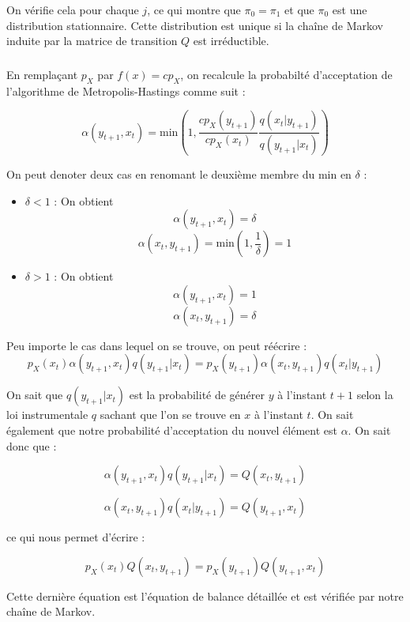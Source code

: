 On vérifie cela pour chaque $j$, ce qui montre que $\pi_0 = \pi_1$ et que $\pi_0$ est une distribution stationnaire. Cette distribution est unique si la chaîne de Markov induite par la matrice de transition $Q$ est irréductible. 

\subsubsection{}
En remplaçant $p_X$ par $f(x) = cp_X$, on recalcule la probabilté d'acceptation de l'algorithme de Metropolis-Hastings comme suit :

\begin{equation*}
  \alpha(y_{t+1},x_t) = \text{min}(1,\frac{cp_X(y_{t+1})}{cp_X(x_t)}\frac{q(x_t|y_{t+1})}{q(y_{t+1}|x_t)})
\end{equation*}

On peut denoter deux cas en renomant le deuxième membre du min en $\delta$ : 

\begin{itemize}
  \item $\delta < 1$ : On obtient 
  \begin{equation*}
    \alpha(y_{t+1},x_t) = \delta
  \end{equation*}
  \begin{equation*}
    \alpha(x_t,y_{t+1}) = \text{min}(1,\frac{1}{\delta}) = 1
  \end{equation*}
  \item $\delta > 1$ : On obtient
  \begin{equation*}
    \alpha(y_{t+1},x_t) = 1
  \end{equation*}
  \begin{equation*}
    \alpha(x_t,y_{t+1}) = \delta
  \end{equation*}
\end{itemize}

Peu importe le cas dans lequel on se trouve, on peut réécrire :
\begin{equation*}
  p_X(x_t)\alpha(y_{t+1},x_t)q(y_{t+1}|x_t) = p_X(y_{t+1})\alpha(x_t,y_{t+1})q(x_t|y_{t+1})
\end{equation*}

On sait que $q(y_{t+1}|x_t)$ est la probabilité de générer $y$ à l'instant $t+1$ selon la loi instrumentale $q$ sachant que l'on se trouve en $x$ à l'instant $t$. On sait 
également que notre probabilité d'acceptation du nouvel élément est $\alpha$. On sait donc que :

\begin{equation*}
  \alpha(y_{t+1},x_t)q(y_{t+1}|x_t) = Q(x_t,y_{t+1})
\end{equation*}

\begin{equation*}
  \alpha(x_t,y_{t+1})q(x_t|y_{t+1}) = Q(y_{t+1},x_t)
\end{equation*}

ce qui nous permet d'écrire :

\begin{equation*}
  p_X(x_t)Q(x_t,y_{t+1}) = p_X(y_{t+1})Q(y_{t+1},x_t)
\end{equation*}

Cette dernière équation est l'équation de balance détaillée et est vérifiée par notre chaîne de Markov.